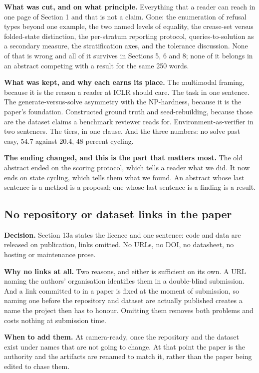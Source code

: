 \textbf{What was cut, and on what principle.} Everything that a reader can reach in one page of
Section 1 and that is not a claim. Gone: the enumeration of refusal types beyond one example, the
two named levels of equality, the crease-set versus folded-state distinction, the per-stratum
reporting protocol, queries-to-solution as a secondary measure, the stratification axes, and the
tolerance discussion. None of that is wrong and all of it survives in Sections 5, 6 and 8; none of
it belongs in an abstract competing with a result for the same 250 words.

\textbf{What was kept, and why each earns its place.} The multimodal framing, because it is the
reason a reader at ICLR should care. The task in one sentence. The generate-versus-solve asymmetry
with the NP-hardness, because it is the paper's foundation. Constructed ground truth and
seed-rebuilding, because those are the dataset claims a benchmark reviewer reads for.
Environment-as-verifier in two sentences. The tiers, in one clause. And the three numbers: no solve
past easy, 54.7 against 20.4, 48 percent cycling.

\textbf{The ending changed, and this is the part that matters most.} The old abstract ended on the
scoring protocol, which tells a reader what we did. It now ends on state cycling, which tells them
what we found. An abstract whose last sentence is a method is a proposal; one whose last sentence is
a finding is a result.

\subsection{No repository or dataset links in the paper}

\textbf{Decision.} Section 13a states the licence and one sentence: code and data are released on
publication, links omitted. No URLs, no DOI, no datasheet, no hosting or maintenance prose.

\textbf{Why no links at all.} Two reasons, and either is sufficient on its own. A URL naming the
authors' organisation identifies them in a double-blind submission. And a link committed to in a
paper is fixed at the moment of submission, so naming one before the repository and dataset are
actually published creates a name the project then has to honour. Omitting them removes both
problems and costs nothing at submission time.

\textbf{When to add them.} At camera-ready, once the repository and the dataset exist under names
that are not going to change. At that point the paper is the authority and the artifacts are renamed
to match it, rather than the paper being edited to chase them.
